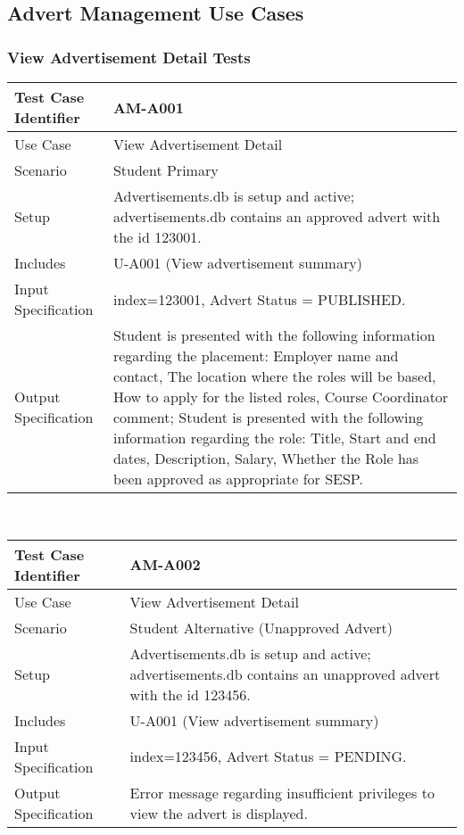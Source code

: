 \documentclass{l3deliverable}
\begin{document}
\newpage
\subsection{Advert Management Use Cases}
\subsubsection{View Advertisement Detail Tests}

\begin{tabular}{lp{10cm}}
\hline 
\textbf{Test Case Identifier} & AM-A001\tabularnewline
\hline 
\hline 
Use Case & View Advertisement Detail \tabularnewline
\hline 
Scenario & Student Primary \tabularnewline
\hline 
Setup & Advertisements.db is setup and active; advertisements.db contains an approved advert with the id 123001.\tabularnewline
\hline 
Includes & U-A001 (View advertisement summary) \tabularnewline
\hline 
Input Specification & index=123001, Advert Status = PUBLISHED. \tabularnewline
\hline 
Output Specification & Student is presented with the following information regarding the placement: Employer name and contact, The location where the roles will be based, How to apply for the listed roles, Course Coordinator comment; Student is presented with the following information regarding the role: Title, Start and end dates, Description, Salary, Whether the Role has been approved as appropriate for SESP.\tabularnewline
\hline 
\end{tabular}\\

\begin{tabular}{lp{10cm}}
\hline 
\textbf{Test Case Identifier} & AM-A002\tabularnewline
\hline 
\hline 
Use Case & View Advertisement Detail \tabularnewline
\hline 
Scenario & Student Alternative (Unapproved Advert) \tabularnewline
\hline 
Setup & Advertisements.db is setup and active; advertisements.db contains an unapproved advert with the id 123456.\tabularnewline
\hline 
Includes & U-A001 (View advertisement summary) \tabularnewline
\hline 
Input Specification & index=123456, Advert Status = PENDING. \tabularnewline
\hline 
Output Specification &  Error message regarding insufficient privileges to view the advert is displayed.\tabularnewline
\hline 
\end{tabular}\\
\end{document}

